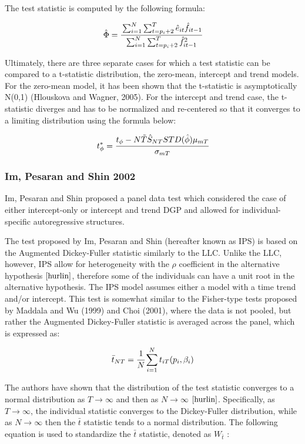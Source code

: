 The test statistic is computed by the following formula:

\begin{equation}
\hat{\Phi} = \cfrac{\sum_{i=1}^{N}\sum_{t=p_i+2}^{T}\hat{e}_{it}\hat{f}_{it-1}}{\sum_{i=1}^{N}\sum_{t=p_i+2}^{T}\hat{f}^2_{it-1}}
\end{equation}



Ultimately, there are three separate cases for which a test statistic can be compared to a t-statistic distribution, the zero-mean, intercept and trend models. For the zero-mean model, it has been shown that the t-statistic is asymptotically N(0,1) (Hlouskova and Wagner, 2005). For the intercept and trend case, the t-statistic diverges and has to be normalized and re-centered so that it converges to a limiting distribution using the formula below:

\begin{equation}
t_{\phi}^*=\cfrac{t_{\phi}-N\tilde{T}\hat{S}_{NT}STD(\hat{\phi})\mu_{mT}}{\sigma_{mT}}
\end{equation}



\subsubsection{Im, Pesaran and Shin 2002}

Im, Pesaran and Shin proposed a panel data test which considered the case of either intercept-only or intercept and trend DGP and allowed for individual-specific autoregressive structures.

The test proposed by Im, Pesaran and Shin (hereafter known as IPS) is based on the Augmented Dickey-Fuller statistic similarly to the LLC. Unlike the LLC, however, IPS allow for heterogeneity with the $\rho$ coefficient in the alternative hypothesis $\cite{hurlin}$, therefore some of the individuals can have a unit root in the alternative hypothesis. The IPS model assumes either a model with a time trend and/or intercept. This test is somewhat similar to the Fisher-type tests proposed by Maddala and Wu (1999) and Choi (2001), where the data is not pooled, but rather the Augmented Dickey-Fuller statistic is averaged across the panel, which is expressed as:

\begin{equation}
\bar{t}_{NT} = \cfrac{1}{N}\sum_{i=1}^{N}t_{iT}(p_i,\beta_i) 
\end{equation}

The authors have shown that the distribution of the test statistic converges to a normal distribution as $T \to  \infty$ and then as $N \to \infty$ $\cite{hurlin}$. Specifically, as $T \to \infty$, the individual statistic converges to the Dickey-Fuller distribution, while as $N \to \infty$ then the $\bar{t}$ statistic tends to a normal distribution. The following equation is used to standardize the $\bar{t}$ statistic, denoted as $W_{\bar{t}}$ :

